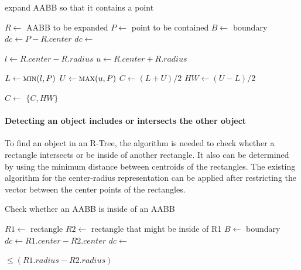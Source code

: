 \documentclass[10pt,letterpaper,twocolumn]{article}
\begin{document}
\begin{algorithm}[thb]
    \caption{expand AABB so that it contains a point}
    \label{expand_aabb_point}
    \begin{algorithmic}
        \State $R \gets$ AABB to be expanded
        \State $P \gets$ point to be contained
        \State $B \gets$ boundary
            \State $dc \gets P - R.center$
            \State $dc \gets$ 

            \State $l \gets R.center - R.radius$
            \State $u \gets R.center + R.radius$

            \State $L  \gets \Call{min}{l, P}$
            \State $U  \gets \Call{max}{u, P}$
            \State $C  \gets (L + U) / 2$
            \State $HW \gets (U - L) / 2$

            \State $C \gets$ 
            \State \Return $\{C, HW\}$
        \EndFunction
     \end{algorithmic}
\end{algorithm}



\paragraph{Detecting an object includes or intersects the other object}

To find an object in an R-Tree, the algorithm is needed to check whether a
rectangle intersects or be inside of another rectangle.
It also can be determined by using the minimum distance between centroids of the
rectangles.
The existing algorithm for the center-radius representation can be applied after
restricting the vector between the center points of the rectangles.

\begin{algorithm}[tbh]
    \caption{Check whether an AABB is inside of an AABB}
    \begin{algorithmic}
        \State $R1 \gets$ rectangle
        \State $R2 \gets$ rectangle that might be inside of R1
        \State $B  \gets$ boundary
            \State $dc \gets R1.center - R2.center$
            \State $dc \gets$ 

            \State \Return {} $\leq (R1.radius - R2.radius)$
        \EndFunction
     \end{algorithmic}
\end{algorithm}
\end{document}
